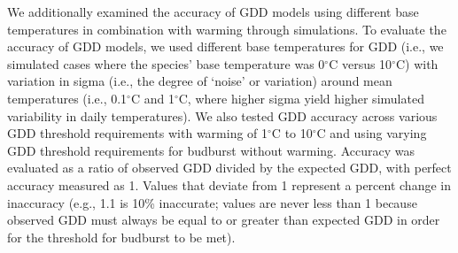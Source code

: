 \documentclass{article}\usepackage[]{graphicx}\usepackage[]{color}
\begin{document}
We additionally examined the accuracy of GDD models using different base temperatures in combination with warming through simulations. To evaluate the accuracy of GDD models, we used different base temperatures for GDD (i.e., we simulated cases where the species' base temperature was 0$^{\circ}$C versus 10$^{\circ}$C) with variation in sigma (i.e., the degree of `noise' or variation) around mean temperatures (i.e., 0.1$^{\circ}$C and 1$^{\circ}$C, where higher sigma yield higher simulated variability in daily temperatures). We also tested GDD accuracy across various GDD threshold requirements with warming of 1$^{\circ}$C to 10$^{\circ}$C and using varying GDD threshold requirements for budburst without warming. Accuracy was evaluated as a ratio of observed GDD divided by the expected GDD, with perfect accuracy measured as 1. Values that deviate from 1 represent a percent change in inaccuracy (e.g., 1.1 is 10\% inaccurate; values are never less than 1 because observed GDD must always be equal to or greater than expected GDD in order for the threshold for budburst to be met).
\end{document}
